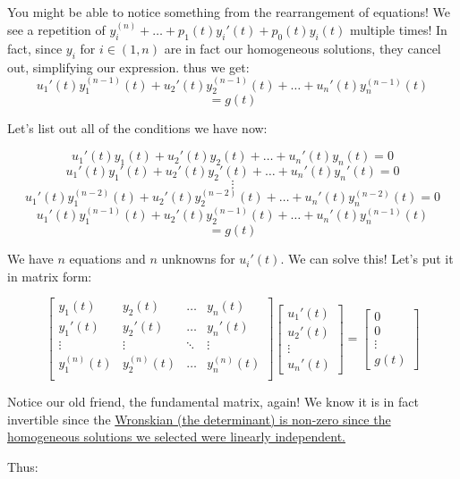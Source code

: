 \documentclass{report}
\begin{document}
You might be able to notice something from the rearrangement of equations! We see a repetition of $y_i^{(n)} + \dots + p_1(t)y_i'(t) + p_0(t)y_i(t)$
multiple times! In fact, since $y_i$ for $i \in (1,n)$ are in fact our homogeneous solutions, they cancel out, simplifying our expression. thus we get:
$$u_1'(t)y_1^{(n-1)}(t) + u_2'(t)y_2^{(n-1)}(t) + \dots + u_n'(t)y_n^{(n-1)}(t)$$
$$=g(t)$$

Let's list out all of the conditions we have now:


$$u_1'(t)y_1(t) + u_2'(t)y_2(t) + \dots + u_n'(t)y_n(t) = 0$$
$$u_1'(t)y_1'(t) + u_2'(t)y_2'(t) + \dots + u_n'(t)y_n'(t) = 0$$
$$\vdots$$
$$u_1'(t)y_1^{(n-2)}(t) + u_2'(t)y_2^{(n-2)}(t) + \dots + u_n'(t)y_n^{(n-2)}(t) = 0$$
$$u_1'(t)y_1^{(n-1)}(t) + u_2'(t)y_2^{(n-1)}(t) + \dots + u_n'(t)y_n^{(n-1)}(t)$$
$$=g(t)$$

We have $n$ equations and $n$ unknowns for $u_i'(t)$. We can solve this! Let's put it in matrix form:

$$
\begin{bmatrix}
    y_1(t) & y_2(t) & \dots  & y_n(t) \\
    y_1'(t) & y_2'(t) & \dots  & y_n'(t) \\
    \vdots & \vdots & \ddots & \vdots \\
    y_1^{(n)}(t) & y_2^{(n)}(t) & \dots  & y_n^{(n)}(t) \\
    \end{bmatrix}
\begin{bmatrix}
    u_1'(t) \\
    u_2'(t) \\
    \vdots \\ 
    u_n'(t)
\end{bmatrix}
=
\begin{bmatrix}
    0 \\
    0 \\
    \vdots \\ 
    g(t)
\end{bmatrix}
$$


Notice our old friend, the fundamental matrix, again! We know it is in fact invertible since the \hyperref[th:EqLinInd]{Wronskian (the determinant) is non-zero since the homogeneous solutions we selected were linearly independent.}

Thus:
\end{document}
